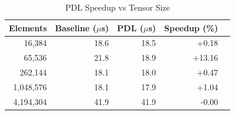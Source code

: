 \begin{table}[t]
\centering
\caption{PDL Speedup vs Tensor Size}
\label{tab:tensor_size}
\begin{tabular}{rrrrr}
\toprule
Elements & Baseline ($\mu$s) & PDL ($\mu$s) & Speedup (\%) \\
\midrule
16,384 & 18.6 & 18.5 & +0.18 \\
65,536 & 21.8 & 18.9 & +13.16 \\
262,144 & 18.1 & 18.0 & +0.47 \\
1,048,576 & 18.1 & 17.9 & +1.04 \\
4,194,304 & 41.9 & 41.9 & -0.00 \\
\bottomrule
\end{tabular}
\end{table}